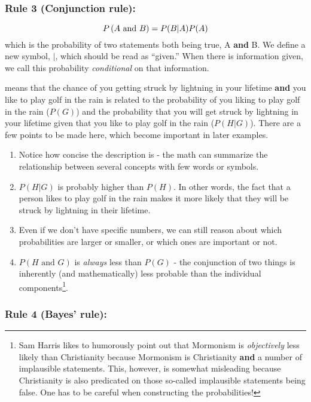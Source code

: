 \documentclass{tufte-book}
\begin{document}
\subsubsection{Rule 3 (Conjunction
rule):}\label{rule-3-conjunction-rule}

\[\P{$A$ and $B$} = P(B|A)P(A)\] which is the probability of two
statements both being true, A \textbf{and} B. We define a new symbol,
\(|\), which should be read as ``given.'' When there is information
given, we call this probability \emph{conditional} on that information.

means that the chance of you getting struck by lightning in your
lifetime \textbf{and} you like to play golf in the rain is related to
the probability of you liking to play golf in the rain (\(P(G)\)) and
the probability that you will get struck by lightning in your lifetime
given that you like to play golf in the rain (\(P(H|G)\)). There are a
few points to be made here, which become important in later examples.

\begin{enumerate}
\def\labelenumi{\arabic{enumi}.}
\itemsep1pt\parskip0pt
\item
  Notice how concise the description is - the math can summarize the
  relationship between several concepts with few words or symbols.\\
\item
  \(P(H|G)\) is probably higher than \(P(H)\). In other words, the fact
  that a person likes to play golf in the rain makes it more likely that
  they will be struck by lightning in their lifetime.
\item
  Even if we don't have specific numbers, we can still reason about
  which probabilities are larger or smaller, or which ones are important
  or not.
\item
  \(P(H \mbox{ and } G)\) is \emph{always} less than \(P(G)\) - the
  conjunction of two things is inherently (and mathematically) less
  probable than the individual components\footnote{Sam Harris likes to
    humorously point out that Mormonism is \emph{objectively} less
    likely than Christianity because Mormonism is Christianity
    \textbf{and} a number of implausible statements. This, however, is
    somewhat misleading because Christianity is also predicated on those
    so-called implausible statements being false. One has to be careful
    when constructing the probabilities!}.
\end{enumerate}

\subsubsection{Rule 4 (Bayes' rule):}\label{rule-4-bayes-rule}
\end{document}

